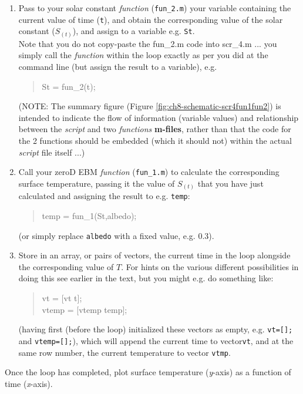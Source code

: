 \documentclass{tufte-book} %
\newenvironment{docspec}{\begin{quotation}\ttfamily\parskip0pt\parindent0pt\ignorespaces}{\end{quotation}}
\begin{document}
\begin{enumerate}[noitemsep]
\setlength{\itemindent}{.2in}
\vspace{1mm}
\item Pass to your solar constant \textit{function} (\texttt{fun\_2.m}) your  variable containing the current value of time (\texttt{t}), and obtain the corresponding value of the solar constant (\(S_{(t)}\)), and assign to a variable e.g. \texttt{St}.
\vspace{1mm}
\\Note that you do not copy-paste the \textsf{fun\_2.m} code into \textsf{scr\_4.m} ... you simply call the \textit{function} within the loop exactly as per you did at the command line (but assign the result to a variable), e.g.
\begin{docspec}
St = fun\_2(t);
\end{docspec}
(NOTE: The summary figure (Figure \ref{fig:ch8-schematic-scr4fun1fun2}) is intended to indicate the flow of information (variable values) and relationship between the \textit{script} and two \textit{functions} \textbf{m-files}, rather than that the code for the 2 functions should be embedded (which it should not) within the actual \textit{script} file itself ...)
\vspace{1mm}
\item  Call your zeroD EBM \textit{function} (\texttt{fun\_1.m}) to calculate the corresponding surface temperature, passing it the value of \(S_{(t)}\) that you have just calculated and assigning the result to  e.g. \texttt{temp}:
\begin{docspec}
temp = fun\_1(St,albedo);
\end{docspec}
(or simply replace \texttt{albedo} with a fixed value, e.g. 0.3).
\vspace{1mm}
\item Store in an array, or pairs of vectors, the current time in the loop alongside the corresponding value of \(T\). For hints on the various different possibilities in doing this see earlier in the text, but you might e.g. do something like:
\begin{docspec}
vt = [vt t];\\
vtemp = [vtemp temp];
\end{docspec}
(having first (before the loop) initialized these vectors as empty, e.g. \texttt{vt=[];} and \texttt{vtemp=[];}), which will append the current time to  vector\texttt{vt}, and at the same row number, the current temperature to vector \texttt{vtmp}.
\end{enumerate}
\vspace{-1mm}
Once the loop has completed, plot surface temperature (\textit{y}-axis) as a function of time (\textit{x}-axis).
\end{document}
